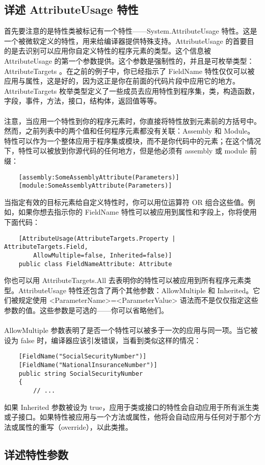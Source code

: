 \subsection{详述 AttributeUsage 特性}
首先要注意的是特性类被标记有一个特性——System.AttributeUsage 特性。这是一个被微软定义的特性，用来给编译器提供特殊支持。AttributeUsage 的首要目的是去识别可以应用你自定义特性的程序元素的类型。这个信息被 AttributeUsage 的第一个参数提供。这个参数是强制性的，并且是可枚举类型：AttributeTargets 。在之前的例子中，你已经指示了 FieldName 特性仅仅可以被应用与属性，这是好的，因为这正是你在前面的代码片段中应用它的地方。AttributeTargets 枚举类型定义了一些成员去应用特性到程序集，类，构造函数，字段，事件，方法，接口，结构体，返回值等等。
\\ \\
注意，当应用一个特性到你的程序元素时，你直接将特性放到元素前的方括号中。然而，之前列表中的两个值和任何程序元素都没有关联：Assembly 和 Module。特性可以作为一个整体应用于程序集或模块，而不是你代码中的元素；在这个情况下，特性可以被放到你源代码的任何地方，但是他必须有 assembly 或 module 前缀：
\begin{verbatim}
    [assembly:SomeAssemblyAttribute(Parameters)]
    [module:SomeAssemblyAttribute(Parameters)]
\end{verbatim}
当指定有效的目标元素给自定义特性时，你可以用位运算符 OR 组合这些值。例如，如果你想去指示你的 FieldName 特性可以被应用到属性和字段上，你将使用下面代码：
\begin{verbatim}
    [AttributeUsage(AttributeTargets.Property | AttributeTargets.Field,
        AllowMultiple=false, Inherited=false)]
    public class FieldNameAttribute: Attribute
\end{verbatim}
你也可以用 AttributeTargets.All 去表明你的特性可以被应用到所有程序元素类型。AttributeUsage 特性还包含了两个其他参数：AllowMultiple 和 Inherited。它们被规定使用 <ParameterName>=<ParameterValue> 语法而不是仅仅指定这些参数的值。这些参数是可选的——你可以省略他们。
\\ \\
AllowMultiple 参数表明了是否一个特性可以被多于一次的应用与同一项。当它被设为 false 时，编译器应该引发错误，当看到类似这样的情况：
\begin{verbatim}
    [FieldName("SocialSecurityNumber")]
    [FieldName("NationalInsuranceNumber")]
    public string SocialSecurityNumber
    {
        // ...
\end{verbatim}
如果 Inherited 参数被设为 true，应用于类或接口的特性会自动应用于所有派生类或子接口。如果特性被应用与一个方法或属性，他将会自动应用与任何对于那个方法或属性的重写（override），以此类推。

\subsection{详述特性参数}